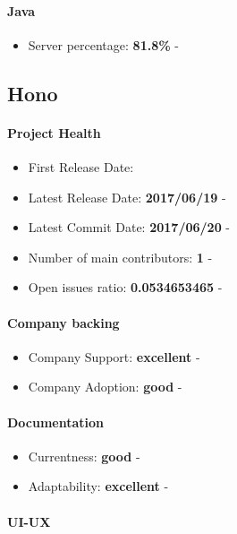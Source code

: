 \documentclass{article}
\begin{document}
\paragraph{Java} 

\begin{itemize}
\item Server percentage: \textbf{81.8\%} - 
\end{itemize}

\subsection{Hono}

\paragraph{Project Health}

\begin{itemize}
\item First Release Date: 
\item Latest Release Date: \textbf{2017/06/19} - 
\item Latest Commit Date: \textbf{2017/06/20} - 
\item Number of main contributors: \textbf{1} - 
\item Open issues ratio: \textbf{0.0534653465} - 
\end{itemize}

\paragraph{Company backing}

\begin{itemize}
\item Company Support: \textbf{excellent} - 
\item Company Adoption: \textbf{good} - 
\end{itemize}

\paragraph{Documentation}

\begin{itemize}
\item Currentness: \textbf{good} - 
\item Adaptability: \textbf{excellent} - 
\end{itemize}

\paragraph{UI-UX}
\end{document}
